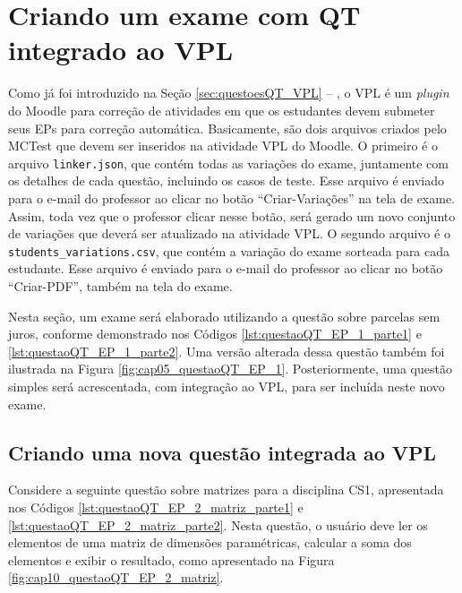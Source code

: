\section{Criando um exame com QT integrado ao VPL}

Como já foi introduzido na Seção \ref{sec:questoesQT_VPL} -- , o VPL é um \textit{plugin} do Moodle para correção de atividades em que os estudantes devem submeter seus EPs para correção automática. Basicamente, são dois arquivos criados pelo MCTest que devem ser inseridos na atividade VPL do Moodle. O primeiro é o arquivo \verb|linker.json|, que contém todas as variações do exame, juntamente com os detalhes de cada questão, incluindo os casos de teste. Esse arquivo é enviado para o e-mail do professor ao clicar no botão ``Criar-Variações'' na tela de exame. Assim, toda vez que o professor clicar nesse botão, será gerado um novo conjunto de variações que deverá ser atualizado na atividade VPL. O segundo arquivo é o \verb|students_variations.csv|, que contém a variação do exame sorteada para cada estudante. Esse arquivo é enviado para o e-mail do professor ao clicar no botão ``Criar-PDF'', também na tela do exame.

Nesta seção, um exame será elaborado utilizando a questão sobre parcelas sem juros, conforme demonstrado nos Códigos \ref{lst:questaoQT_EP_1_parte1} e \ref{lst:questaoQT_EP_1_parte2}. Uma versão alterada dessa questão também foi ilustrada na Figura \ref{fig:cap05_questaoQT_EP_1}. Posteriormente, uma questão simples será acrescentada, com integração ao VPL, para ser incluída neste novo exame.

\subsection{Criando uma nova questão integrada ao VPL}

Considere a seguinte questão sobre matrizes para a disciplina CS1, apresentada nos Códigos \ref{lst:questaoQT_EP_2_matriz_parte1} e \ref{lst:questaoQT_EP_2_matriz_parte2}. Nesta questão, o usuário deve ler os elementos de uma matriz de dimensões paramétricas, calcular a soma dos elementos e exibir o resultado, como apresentado na Figura \ref{fig:cap10_questaoQT_EP_2_matriz}.

